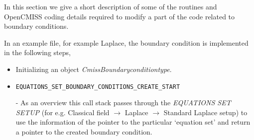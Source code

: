 In this section we give a short description of some of the routines and OpenCMISS coding details required to modify a part of the code related 
to boundary conditions.

In an example file, for example Laplace, the boundary condition is implemented in the following steps,

\begin{itemize}
 \item  Initializing an object \emph{CmissBoundaryconditiontype}.

 \item
\begin{verbatim}
EQUATIONS_SET_BOUNDARY_CONDITIONS_CREATE_START 
\end{verbatim} 

 - As an overview this call stack passes through the \emph{EQUATIONS SET SETUP} (for e.g. Classical field $\rightarrow$ Laplace
 $\rightarrow$ Standard Laplace setup) to use the information of the pointer to the particular `equation set' and return a pointer to the created boundary condition. 


\end{itemize}
